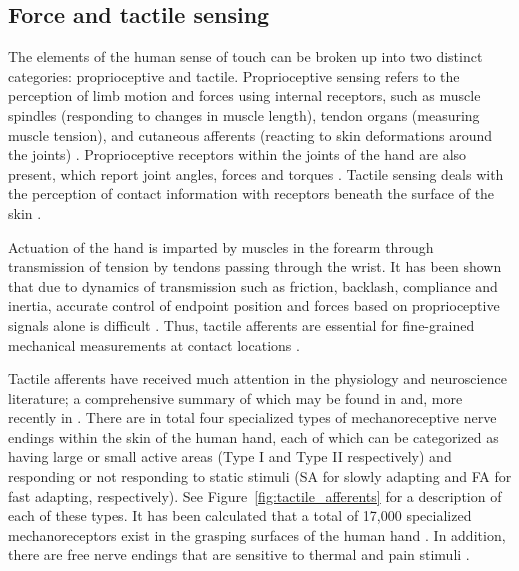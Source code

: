 
\subsection{Force and tactile sensing}
\label{touch_sensing}
The elements of the human sense of touch can be broken up into two distinct categories: proprioceptive and tactile.
Proprioceptive sensing refers to the perception of limb motion and forces using internal receptors, such as muscle spindles (responding to changes in muscle length), tendon organs (measuring muscle tension), and cutaneous afferents (reacting to skin deformations around the joints) \cite{johansson2009coding}.
Proprioceptive receptors within the joints of the hand are also present, which report joint angles, forces and torques \cite{howe1993tactile}.
Tactile sensing deals with the perception of contact information with receptors beneath the surface of the skin \cite{vallbo1984properties}.

Actuation of the hand is imparted by muscles in the forearm through transmission of tension by tendons passing through the wrist.
It has been shown that due to dynamics of transmission such as friction, backlash, compliance and inertia, accurate control of endpoint position and forces based on proprioceptive signals alone is difficult \cite{kaneko1991new}.
Thus, tactile afferents are essential for fine-grained mechanical measurements at contact locations \cite{Johansson1984}.

Tactile afferents have received much attention in the physiology and neuroscience literature; a comprehensive summary of which may be found in \cite{vallbo1984properties} and, more recently in \cite{johansson2009coding}.
There are in total four specialized types of mechanoreceptive nerve endings within the skin of the human hand, each of which can be categorized as having large or small active areas (Type I and Type II respectively) and responding or not responding to static stimuli (SA for slowly adapting and FA for
fast adapting, respectively).
See Figure~\ref{fig:tactile_afferents} for a description of each of these types.
It has been calculated that a total of 17,000 specialized mechanoreceptors exist in the grasping surfaces of the human hand \cite{johansson2009coding}.
In addition, there are free nerve endings that are sensitive to thermal and pain stimuli \cite{howe1993tactile}.

